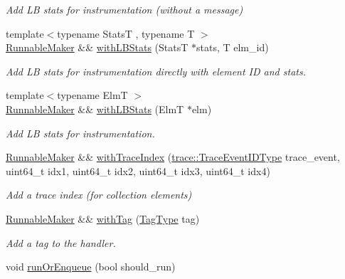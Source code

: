 \begin{DoxyCompactItemize}
\begin{DoxyCompactList}\small\item\em Add LB stats for instrumentation (without a message) \end{DoxyCompactList}\item 
{\footnotesize template$<$typename StatsT , typename T $>$ }\\\hyperlink{structvt_1_1runnable_1_1_runnable_maker}{Runnable\+Maker} \&\& \hyperlink{structvt_1_1runnable_1_1_runnable_maker_aa90abf37417f61aed6c4d76bf334e0f5}{with\+L\+B\+Stats} (StatsT $\ast$stats, T elm\+\_\+id)
\begin{DoxyCompactList}\small\item\em Add LB stats for instrumentation directly with element ID and stats. \end{DoxyCompactList}\item 
{\footnotesize template$<$typename ElmT $>$ }\\\hyperlink{structvt_1_1runnable_1_1_runnable_maker}{Runnable\+Maker} \&\& \hyperlink{structvt_1_1runnable_1_1_runnable_maker_a2d59781f97ad319ceefcde673339364c}{with\+L\+B\+Stats} (ElmT $\ast$elm)
\begin{DoxyCompactList}\small\item\em Add LB stats for instrumentation. \end{DoxyCompactList}\item 
\hyperlink{structvt_1_1runnable_1_1_runnable_maker}{Runnable\+Maker} \&\& \hyperlink{structvt_1_1runnable_1_1_runnable_maker_a37eb87c4f7d045cfa5ff7e11d9082dd3}{with\+Trace\+Index} (\hyperlink{namespacevt_1_1trace_a64a7185f3e102df8d8258f263ccd1582}{trace\+::\+Trace\+Event\+I\+D\+Type} trace\+\_\+event, uint64\+\_\+t idx1, uint64\+\_\+t idx2, uint64\+\_\+t idx3, uint64\+\_\+t idx4)
\begin{DoxyCompactList}\small\item\em Add a trace index (for collection elements) \end{DoxyCompactList}\item 
\hyperlink{structvt_1_1runnable_1_1_runnable_maker}{Runnable\+Maker} \&\& \hyperlink{structvt_1_1runnable_1_1_runnable_maker_a3a22a3b3952eb54f07e610000f833d7e}{with\+Tag} (\hyperlink{namespacevt_a84ab281dae04a52a4b243d6bf62d0e52}{Tag\+Type} tag)
\begin{DoxyCompactList}\small\item\em Add a tag to the handler. \end{DoxyCompactList}\item 
void \hyperlink{structvt_1_1runnable_1_1_runnable_maker_aa0ae94d80e43385c18ee1e2afbce59a2}{run\+Or\+Enqueue} (bool should\+\_\+run)

\end{DoxyCompactItemize}
